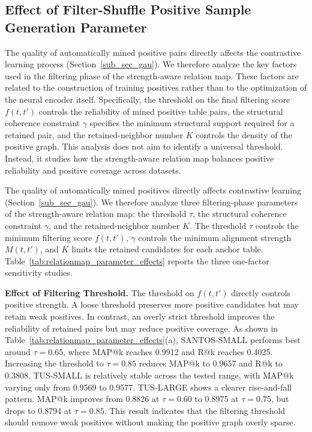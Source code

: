 \iffalse
\subsection{Effect of Filter-Shuffle Positive Sample Generation Parameter }
\label{sec_param_analysis}

The quality of automatically mined positive pairs directly affects the
contrastive learning process  (Section~\ref{sub_sec_gau}). We therefore analyze the key factors used in the
filtering phase of the strength-aware relation map. These factors are related
to the construction of training positives rather than to the optimization of
the neural encoder itself. Specifically, the threshold on the final filtering
score \(f(t,t')\) controls the reliability of mined positive table pairs, the
structural coherence constraint \(\gamma\) specifies the minimum structural
support required for a retained pair, and the retained-neighbor number \(K\)
controls the density of the positive graph. This analysis does not aim to
identify a universal threshold. Instead, it studies how the strength-aware
relation map balances positive reliability and positive coverage across
datasets.


The quality of automatically mined positives directly affects contrastive learning  (Section~\ref{sub_sec_gau}). We therefore analyze three filtering-phase parameters of the strength-aware relation map: the threshold \(\tau\), the structural coherence constraint \(\gamma\), and the retained-neighbor number \(K\). The threshold \(\tau\) controls the minimum filtering score \(f(t,t')\), \(\gamma\) controls the minimum alignment strength \(M(t,t')\), and \(K\) limits the retained candidates for each anchor table. Table~\ref{tab:relationmap_parameter_effects} reports the three one-factor sensitivity studies.

\textbf{Effect of Filtering Threshold. }The threshold on \(f(t,t')\) directly controls positive strength. A loose
threshold preserves more positive candidates but may retain weak positives. In
contrast, an overly strict threshold improves the reliability of retained
pairs but may reduce positive coverage. As shown in
Table~\ref{tab:relationmap_parameter_effects}(a), SANTOS-SMALL performs best around
\(\tau=0.65\), where MAP@k reaches 0.9912 and R@k reaches 0.4025. Increasing
the threshold to \(\tau=0.85\) reduces MAP@k to 0.9657 and R@k to 0.3808.
TUS-SMALL is relatively stable across the tested range, with MAP@k varying
only from 0.9569 to 0.9577. TUS-LARGE shows a clearer rise-and-fall pattern.
MAP@k improves from 0.8826 at \(\tau=0.60\) to 0.8975 at \(\tau=0.75\), but
drops to 0.8794 at \(\tau=0.85\). This result indicates that the filtering
threshold should remove weak positives without making the positive graph
overly sparse.

